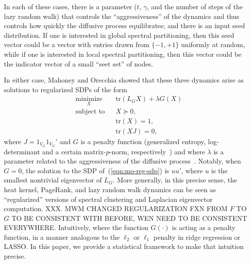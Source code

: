 \documentclass[12pt]{article}
\theoremstyle{plain}
\begin{document}
In each of these cases, there is a parameter ($t$, $\gamma$, and the number 
of steps of the lazy random walk) that controls the ``aggressiveness'' of 
the dynamics and thus controls how quickly the diffusive process 
equilibrates; and there is an input seed distribution.
If one is interested in global spectral partitioning, then this seed vector 
could be a vector with entries drawn from $\{-1,+1\}$ uniformly at random, 
while if one is interested in local spectral partitioning, then this vector 
could be the indicator vector of a small ``seet set'' of nodes.

In either case, Mahoney and Orecchia showed that these three dynamics arise 
as solutions to regularized SDPs of the form
\begin{equation}
\begin{aligned}
  & \underset{X}{\text{minimize}}
  & & \mathrm{tr}(L_G X) + \lambda G(X) \\
  & \text{subject to}
  & & X \succeq 0, \\
  & & & \mathrm{tr}(X) = 1, \\
  & & & \mathrm{tr}(X J) = 0,
\end{aligned}
\label{eqn:mo-reg-sdp}
\end{equation}
where $J = 1_{V_G} 1_{V_G}'$ and $G$ is a penalty function (generalized 
entropy, log-determinant and a certain matrix-$p$-norm, 
respectively~\cite{mahoney2010implementing}) and where $\lambda$ is a 
parameter related to the aggressiveness of the diffusive 
process~\cite{mahoney2010implementing}.  
Notably, when $G = 0$, the solution to the SDP 
of~(\ref{eqn:mo-reg-sdp}) is $u u'$, where $u$ is the smallest nontrivial 
eigenvector of $L_G$.  
More generally, in this precise sense, the heat kernel, PageRank, and lazy 
random walk dynamics can be seen as ``regularized'' versions of spectral 
clustering and Laplacian eigenvector computation.
XXX.  MWM CHANGED REGULARIZATION FXN FROM $F$ TO $G$ TO BE CONSISTENT WITH BEFORE, WEN NEED TO BE CONSISTENT EVERYWHERE.
Intuitively, where the function $G(\cdot)$ is acting as a penalty function, 
in a manner analogous to the $\ell_2$ or $\ell_1$ penalty in ridge 
regression or LASSO.
In this paper, we provide a statistical framework to make that intuition 
precise.

\end{document}
